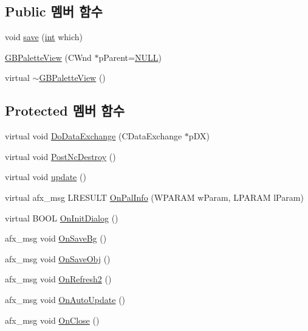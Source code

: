 \subsection*{Public 멤버 함수}
\begin{DoxyCompactItemize}
\item 
void \mbox{\hyperlink{class_g_b_palette_view_a90cca0ba09442c669f7403d31e8ab0ee}{save}} (\mbox{\hyperlink{_util_8cpp_a0ef32aa8672df19503a49fab2d0c8071}{int}} which)
\item 
\mbox{\hyperlink{class_g_b_palette_view_a2e6568baf28747b9f2f0169cbbaf6e20}{G\+B\+Palette\+View}} (C\+Wnd $\ast$p\+Parent=\mbox{\hyperlink{_system_8h_a070d2ce7b6bb7e5c05602aa8c308d0c4}{N\+U\+LL}})
\item 
virtual \mbox{\hyperlink{class_g_b_palette_view_ab0ac489c91411545a1d09750ee256bf5}{$\sim$\+G\+B\+Palette\+View}} ()
\end{DoxyCompactItemize}
\subsection*{Protected 멤버 함수}
\begin{DoxyCompactItemize}
\item 
virtual void \mbox{\hyperlink{class_g_b_palette_view_a44dd90ae3c09c4fb0b2788a4c0577634}{Do\+Data\+Exchange}} (C\+Data\+Exchange $\ast$p\+DX)
\item 
virtual void \mbox{\hyperlink{class_g_b_palette_view_a076a96cf195fe071e3050704636247ff}{Post\+Nc\+Destroy}} ()
\item 
virtual void \mbox{\hyperlink{class_g_b_palette_view_a43a43edd82e080e860aeb6a82ec106fc}{update}} ()
\item 
virtual afx\+\_\+msg L\+R\+E\+S\+U\+LT \mbox{\hyperlink{class_g_b_palette_view_a01960a28d93aef1873f5d5256fa11c79}{On\+Pal\+Info}} (W\+P\+A\+R\+AM w\+Param, L\+P\+A\+R\+AM l\+Param)
\item 
virtual B\+O\+OL \mbox{\hyperlink{class_g_b_palette_view_a8d71e7140c51c2a7a81c39398497e61e}{On\+Init\+Dialog}} ()
\item 
afx\+\_\+msg void \mbox{\hyperlink{class_g_b_palette_view_a0186b41f6db460271256f36800ffa980}{On\+Save\+Bg}} ()
\item 
afx\+\_\+msg void \mbox{\hyperlink{class_g_b_palette_view_a20eb0c24604804e9c33db15f3ff394f0}{On\+Save\+Obj}} ()
\item 
afx\+\_\+msg void \mbox{\hyperlink{class_g_b_palette_view_a15d94f40712405e466296772b7087f3f}{On\+Refresh2}} ()
\item 
afx\+\_\+msg void \mbox{\hyperlink{class_g_b_palette_view_a8d2c0e66a90accbbe35b286a51857728}{On\+Auto\+Update}} ()
\item 
afx\+\_\+msg void \mbox{\hyperlink{class_g_b_palette_view_a7cbc4954d55851e0991ee4419904fcec}{On\+Close}} ()
\end{DoxyCompactItemize}


